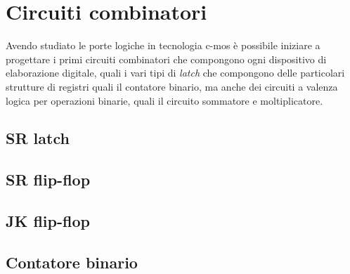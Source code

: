 \chapter{Circuiti combinatori}
	
	Avendo studiato le porte logiche in tecnologia c-mos è possibile iniziare a progettare i primi circuiti combinatori che compongono ogni dispositivo di elaborazione digitale, quali i vari tipi di \textit{latch} che compongono delle particolari strutture di registri quali il contatore binario, ma anche dei circuiti a valenza logica per operazioni binarie, quali il circuito sommatore e moltiplicatore.
	
\section{SR latch}

\section{SR flip-flop}

\section{JK flip-flop}

\section{Contatore binario}